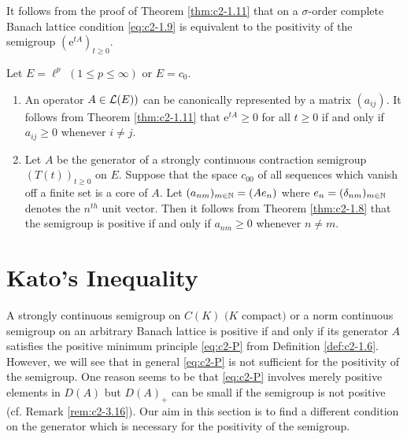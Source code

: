 \begin{remark}\label{rem:c2-1.12}
%
%
%
It follows from the proof of Theorem \ref{thm:c2-1.11}   that on a $\sigma$-order complete Banach lattice condition  \eqref{eq:c2-1.9} is equivalent to the positivity of the semigroup $(\mathrm{e}^{tA})_{t \geq 0}$.
\end{remark}
\begin{examples}\label{ex:c2-1.13}
%
%
%
Let $E = \ell^p$ $(1 \leq p \leq \infty)$ or $E = c_{0}$.
\begin{enumerate}[\upshape (i), wide, labelindent=.5em] %
\item \label{ex:c2-1.13-1}
An operator $A \in \mathcal{L}(E))$ can be canonically represented by a matrix $(a_{ij})$. 
It follows from Theorem \ref{thm:c2-1.11} that $\mathrm{e}^{tA} \geq 0$ for all $t \geq 0$ if and only if $a_{ij} \geq 0$ whenever $i \neq j$.
\item \label{ex:c2-1.13-2}
Let $A$ be the generator of a strongly continuous contraction semigroup $(T(t))_{t \geq 0}$ on $E$.
Suppose that the space $c_{00}$ of all sequences which vanish off a finite set is a core of $A$.
Let $(a_{nm})_{m \in \mathbb{N}} = (Ae_{n})$ where $e_{n} = (\delta_{nm})_{m \in \mathbb{N}}$ denotes the $n^{th}$ unit vector.
Then it follows from Theorem \ref{thm:c2-1.8}   that the semigroup is positive if and only if $a_{nm} \geq 0$ whenever $n \neq m$.
\end{enumerate}
\end{examples}
\section{Kato's Inequality} \label{sec:c2-2}
%
%
A strongly continuous semigroup on $C(K)$ $(K$ compact$)$ or a norm continuous semigroup on an arbitrary Banach lattice is positive if and only if its generator $A$ satisfies the positive minimum principle \eqref{eq:c2-P} from Definition \ref{def:c2-1.6}.
However, we will see that in general \eqref{eq:c2-P} is not sufficient for the positivity of the semigroup.
One reason seems to be that \eqref{eq:c2-P} involves merely positive elements in $D(A)$ but $D(A)_{+}$ can be small if the semigroup is not positive (cf. Remark \ref{rem:c2-3.16}).
Our aim in this section is to find a different condition on the generator which is necessary for the positivity of the semigroup.

